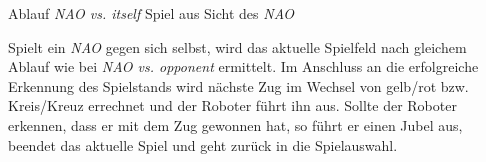 \begin{algorithm}[H]
    \LinesNumbered
    \SetAlgoLined
    \caption{Ablauf \textit{NAO vs. itself} Spiel aus Sicht des \textit{NAO}}\label{alg:game_sequence}
\end{algorithm}
\vspace{\baselineskip}
Spielt ein \textit{NAO} gegen sich selbst, wird das aktuelle Spielfeld nach gleichem Ablauf wie bei \textit{NAO vs. opponent} ermittelt. Im Anschluss an die erfolgreiche Erkennung des Spielstands wird  nächste Zug im Wechsel von gelb/rot bzw. Kreis/Kreuz errechnet und der Roboter führt ihn aus. Sollte der Roboter erkennen, dass er mit dem Zug gewonnen hat, so führt er einen Jubel aus, beendet das aktuelle Spiel und geht zurück in die Spielauswahl.\\